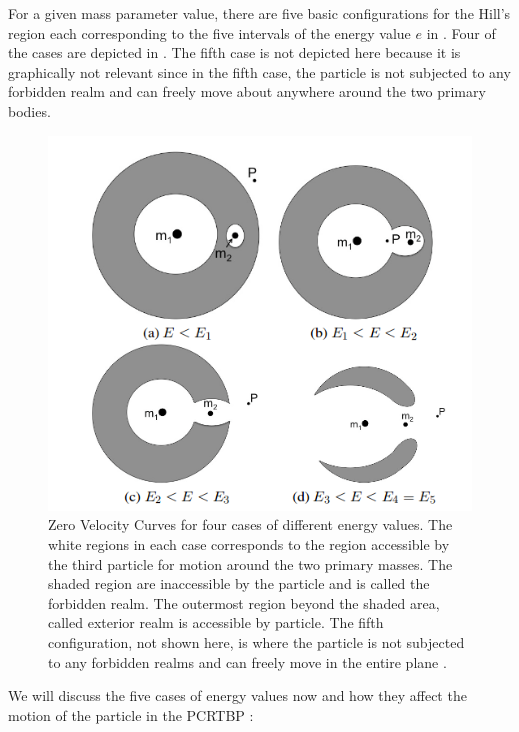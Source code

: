 For a given mass parameter value, there are five basic configurations for the Hill's region each corresponding to the five intervals of the energy value $e$ in . Four of the cases are depicted in . The fifth case is not depicted here because it is graphically not relevant since in the fifth case, the particle is not subjected to any forbidden realm and can freely move about anywhere around the two primary bodies.
%
\begin{figure}[h]
\centering
\captionsetup{justification=centering}
\includegraphics[scale=0.7]{hill_2.png}
\caption{Zero Velocity Curves for four cases of different energy values. The white regions in each case corresponds to the region accessible by the third particle for motion around the two primary masses. The shaded region are inaccessible by the particle and is called the forbidden realm. The outermost region beyond the shaded area, called exterior realm is accessible by particle. The fifth configuration, not shown here, is where the particle is not subjected to any forbidden realms and can freely move in the entire plane \cite{moore2009_invariant}.}
\label{fig:Hill}
\end{figure}
\FloatBarrier
%
We will discuss the five cases of energy values now and how they affect the motion of the particle in the \gls{PCRTBP} \cite{invariant}:
